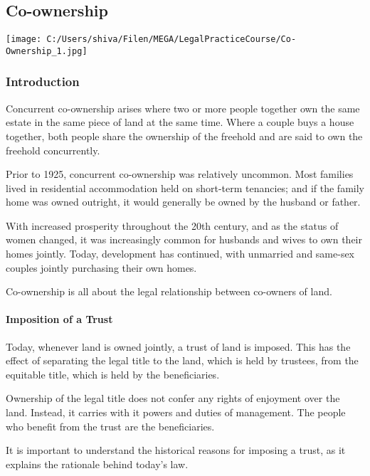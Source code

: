 \documentclass[
]{article}
\begin{document}
\hypertarget{co-ownership}{%
\subsection{Co-ownership}\label{co-ownership}}

\texttt{[image: C:/Users/shiva/Filen/MEGA/LegalPracticeCourse/Co-Ownership\_1.jpg]}

\hypertarget{introduction-2}{%
\subsubsection{Introduction}\label{introduction-2}}

Concurrent co-ownership arises where two or more people together own the
same estate in the same piece of land at the same time. Where a couple
buys a house together, both people share the ownership of the freehold
and are said to own the freehold concurrently.

Prior to 1925, concurrent co-ownership was relatively uncommon. Most
families lived in residential accommodation held on short-term
tenancies; and if the family home was owned outright, it would generally
be owned by the husband or father.

With increased prosperity throughout the 20th century, and as the status
of women changed, it was increasingly common for husbands and wives to
own their homes jointly. Today, development has continued, with
unmarried and same-sex couples jointly purchasing their own homes.

Co-ownership is all about the legal relationship between co-owners of
land.

\hypertarget{imposition-of-a-trust}{%
\paragraph{Imposition of a Trust}\label{imposition-of-a-trust}}

Today, whenever land is owned jointly, a trust of land is imposed. This
has the effect of separating the legal title to the land, which is held
by trustees, from the equitable title, which is held by the
beneficiaries.

Ownership of the legal title does not confer any rights of enjoyment
over the land. Instead, it carries with it powers and duties of
management. The people who benefit from the trust are the beneficiaries.

It is important to understand the historical reasons for imposing a
trust, as it explains the rationale behind today's law.
\end{document}
